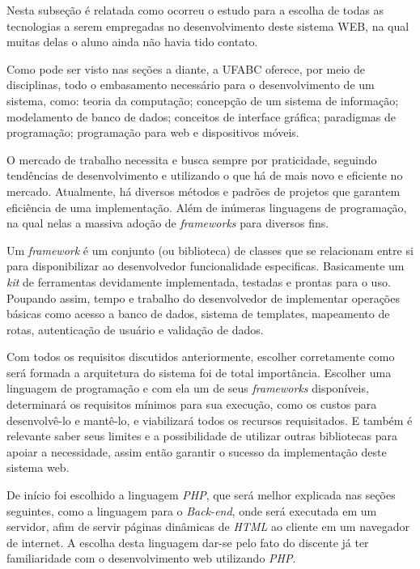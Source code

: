 \documentclass[
  12pt,				%
  openany,
  oneside,
  a4paper,			%
  english,			%
  brazil
]{article}
\numberwithin{figure}{section}
\numberwithin{table}{section}
\begin{document}
Nesta subseção é relatada como ocorreu o estudo para a escolha de todas as tecnologias a serem empregadas no desenvolvimento deste sistema WEB, na qual muitas delas o aluno ainda não havia tido contato.

Como pode ser visto nas seções a diante, a UFABC oferece, por meio de disciplinas, todo o embasamento necessário para o desenvolvimento de um sistema, como: teoria da computação; concepção de um sistema de informação; modelamento de banco de dados; conceitos de interface gráfica; paradigmas de programação; programação para web e dispositivos móveis. 

O mercado de trabalho necessita e busca sempre por praticidade, seguindo tendências de desenvolvimento e utilizando o que há de mais novo e eficiente no mercado. Atualmente, há diversos métodos e padrões de projetos que garantem eficiência de uma implementação. Além de inúmeras linguagens de programação, na qual nelas a massiva adoção de \textit{frameworks} para diversos fins.

Um \textit{framework} é um conjunto (ou biblioteca) de classes que se relacionam entre si para disponibilizar ao desenvolvedor funcionalidade especificas. Basicamente um \textit{kit} de ferramentas devidamente implementada, testadas e prontas para o uso. Poupando assim, tempo e trabalho do desenvolvedor de implementar operações básicas como acesso a banco de dados, sistema de templates, mapeamento de rotas, autenticação de usuário e validação de dados.

Com todos os requisitos discutidos anteriormente, escolher corretamente como será formada a arquitetura do sistema foi de total importância. Escolher uma linguagem de programação e com ela um de seus \textit{frameworks} disponíveis, determinará os requisitos mínimos para sua execução, como os custos para desenvolvê-lo e mantê-lo, e viabilizará todos os recursos requisitados. E também é relevante saber seus limites e a possibilidade de utilizar outras bibliotecas para apoiar a necessidade, assim então garantir o sucesso da implementação deste sistema web.

De início foi escolhido a linguagem \textit{PHP}, que será melhor explicada nas seções seguintes, como a linguagem para o \textit{Back-end}, onde será executada em um servidor, afim de servir páginas dinâmicas de \textit{HTML} ao cliente em um navegador de internet. A escolha desta linguagem dar-se pelo fato do discente já ter familiaridade com o desenvolvimento web utilizando \textit{PHP}.
\end{document}
